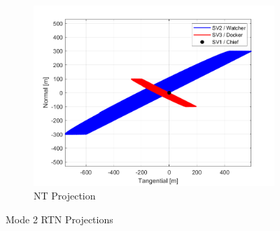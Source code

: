 \begin{figure}[H]
\begin{subfigure}[b]{0.32\linewidth}
        \includegraphics[width=\linewidth]{sim/figures/PS5/mode_2_RTN.png_NT.png}
        \caption{NT Projection}
        \label{fig:mode_2_nt}
    \end{subfigure}
    \caption{Mode 2 RTN Projections}
    \label{fig:mode_2_rtn}
\end{figure}

